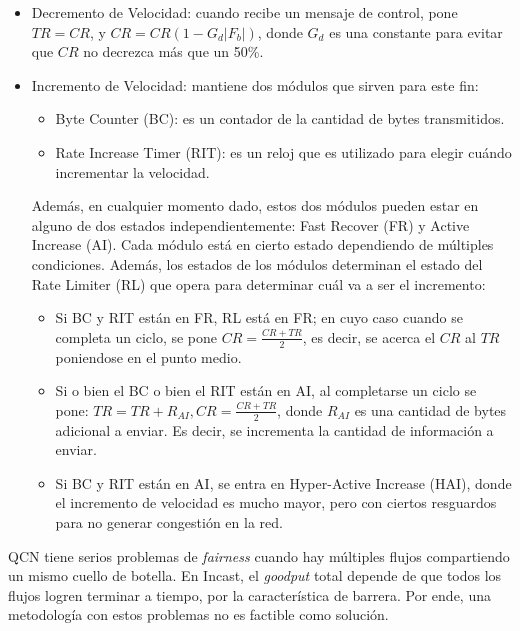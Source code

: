 \documentclass[runningheads,a4paper]{llncs}
\begin{document}
\begin{itemize}
    \item Decremento de Velocidad: cuando recibe un mensaje de control, pone $TR = CR$, y $CR = CR (1 - G_d |F_b|)$, donde $G_d$ es una constante para evitar que $CR$ no decrezca más que un 50\%.
    
    \item Incremento de Velocidad: mantiene dos módulos que sirven para este fin:
        \begin{itemize}
            \item Byte Counter (BC): es un contador de la cantidad de bytes transmitidos.
            \item Rate Increase Timer (RIT): es un reloj que es utilizado para elegir cuándo incrementar la velocidad.
        \end{itemize}
    Además, en cualquier momento dado, estos dos módulos pueden estar en alguno de dos estados independientemente: Fast Recover (FR) y Active Increase (AI). Cada módulo está en cierto estado dependiendo de múltiples condiciones. Además, los estados de los módulos determinan el estado del Rate Limiter (RL) que opera para determinar cuál va a ser el incremento:
        \begin{itemize}
            \item Si BC y RIT están en FR, RL está en FR; en cuyo caso cuando se completa un ciclo, se pone $CR = \frac{CR + TR}{2}$, es decir, se acerca el $CR$ al $TR$ poniendose en el punto medio.
            
            \item Si o bien el BC o bien el RIT están en AI, al completarse un ciclo se pone: $TR = TR + R_{AI}, CR = \frac{CR + TR}{2}$, donde $R_{AI}$ es una cantidad de bytes adicional a enviar. Es decir, se incrementa la cantidad de información a enviar.
            
            \item Si BC y RIT están en AI, se entra en Hyper-Active Increase (HAI), donde el incremento de velocidad es mucho mayor, pero con ciertos resguardos para no generar congestión en la red.
        \end{itemize}
\end{itemize}

QCN tiene serios problemas de \textit{fairness} cuando hay múltiples flujos compartiendo un mismo cuello de botella. En Incast, el \textit{goodput} total depende de que todos los flujos logren terminar a tiempo, por la característica de barrera. Por ende, una metodología con estos problemas no es factible como solución.
\end{document}
